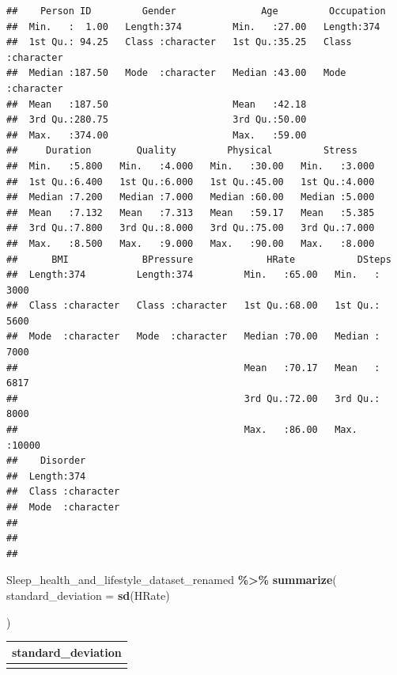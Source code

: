 \documentclass[
  11pt,
]{article}
\newenvironment{Shaded}{\begin{snugshade}}{\end{snugshade}}
\newcommand{\AttributeTok}[1]{\textcolor[rgb]{0.13,0.29,0.53}{#1}}
\newcommand{\FunctionTok}[1]{\textcolor[rgb]{0.13,0.29,0.53}{\textbf{#1}}}
\newcommand{\NormalTok}[1]{#1}
\newcommand{\SpecialCharTok}[1]{\textcolor[rgb]{0.81,0.36,0.00}{\textbf{#1}}}
\begin{document}
\begin{verbatim}
##    Person ID         Gender               Age         Occupation       
##  Min.   :  1.00   Length:374         Min.   :27.00   Length:374        
##  1st Qu.: 94.25   Class :character   1st Qu.:35.25   Class :character  
##  Median :187.50   Mode  :character   Median :43.00   Mode  :character  
##  Mean   :187.50                      Mean   :42.18                     
##  3rd Qu.:280.75                      3rd Qu.:50.00                     
##  Max.   :374.00                      Max.   :59.00                     
##     Duration        Quality         Physical         Stress     
##  Min.   :5.800   Min.   :4.000   Min.   :30.00   Min.   :3.000  
##  1st Qu.:6.400   1st Qu.:6.000   1st Qu.:45.00   1st Qu.:4.000  
##  Median :7.200   Median :7.000   Median :60.00   Median :5.000  
##  Mean   :7.132   Mean   :7.313   Mean   :59.17   Mean   :5.385  
##  3rd Qu.:7.800   3rd Qu.:8.000   3rd Qu.:75.00   3rd Qu.:7.000  
##  Max.   :8.500   Max.   :9.000   Max.   :90.00   Max.   :8.000  
##      BMI             BPressure             HRate           DSteps     
##  Length:374         Length:374         Min.   :65.00   Min.   : 3000  
##  Class :character   Class :character   1st Qu.:68.00   1st Qu.: 5600  
##  Mode  :character   Mode  :character   Median :70.00   Median : 7000  
##                                        Mean   :70.17   Mean   : 6817  
##                                        3rd Qu.:72.00   3rd Qu.: 8000  
##                                        Max.   :86.00   Max.   :10000  
##    Disorder        
##  Length:374        
##  Class :character  
##  Mode  :character  
##                    
##                    
## 
\end{verbatim}

\begin{Shaded}
\begin{Highlighting}[]
\NormalTok{Sleep\_health\_and\_lifestyle\_dataset\_renamed }\SpecialCharTok{\%\textgreater{}\%}
  \FunctionTok{summarize}\NormalTok{(}
    \AttributeTok{standard\_deviation =} \FunctionTok{sd}\NormalTok{(HRate)}
    
\NormalTok{  )}
\end{Highlighting}
\end{Shaded}

\begin{longtable}[]{@{}r@{}}
\toprule\noalign{}
standard\_deviation \\
\midrule\noalign{}
\endhead
\bottomrule\noalign{}
\endlastfoot
4.135675 \\
\end{longtable}
\end{document}
